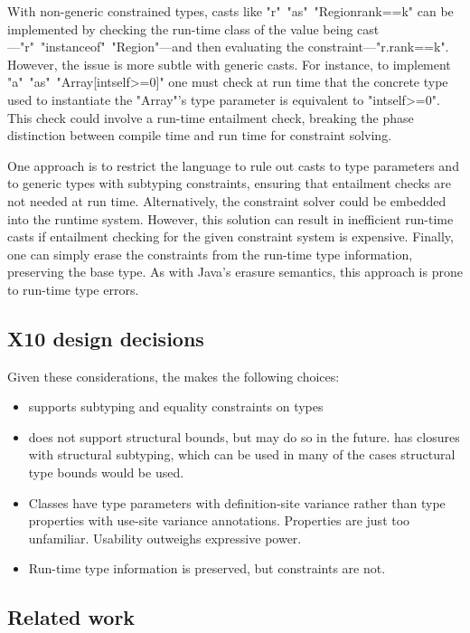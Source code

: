With
non-generic constrained types, casts like
\xcd"r"~\xcd"as"~\xcd"Region{rank==k}" can be implemented by
checking the run-time class of the value being
cast---\xcd"r"~\xcd"instanceof"~\xcd"Region"---and then
evaluating the constraint---\xcd"r.rank==k".
%
However, the issue is more subtle with generic casts.
For instance, to implement
\xcd"a"~\xcd"as"~\xcd"Array[int{self>=0}]"
one must check at run time that the concrete type used to instantiate
the \xcd"Array"'s type parameter is equivalent to
\xcd"int{self>=0}".  This check could involve a run-time
entailment check, 
breaking the phase distinction between
compile time and run time for constraint solving.

One approach is to restrict the language 
to rule out casts to type parameters 
and to generic types with subtyping constraints, ensuring that
entailment checks are not needed at run time.
Alternatively, 
the constraint solver could be embedded into the runtime system.
However, this
solution can result in inefficient run-time casts
if entailment checking for the given constraint system is expensive.
Finally, one can simply erase the constraints from the run-time
type information, preserving the base type.  As with Java's
erasure semantics, this approach is prone to run-time type
errors.

\subsection{X10 design decisions}

Given these considerations, the \Xten makes the following choices:
\begin{itemize}
\item \Xten supports subtyping and equality constraints on types
\item \Xten does not support structural bounds, but may do so in
the future.  \Xten has closures with structural subtyping, which
can be used in many of the cases structural type bounds would be
used.
\item Classes have type parameters with definition-site variance
rather than type properties with use-site variance annotations.
Properties are just too unfamiliar.
Usability outweighs expressive power. 
\item Run-time type information is preserved, but constraints
are not.  
\end{itemize}


\subsection{Related work}
\label{sec:related}

